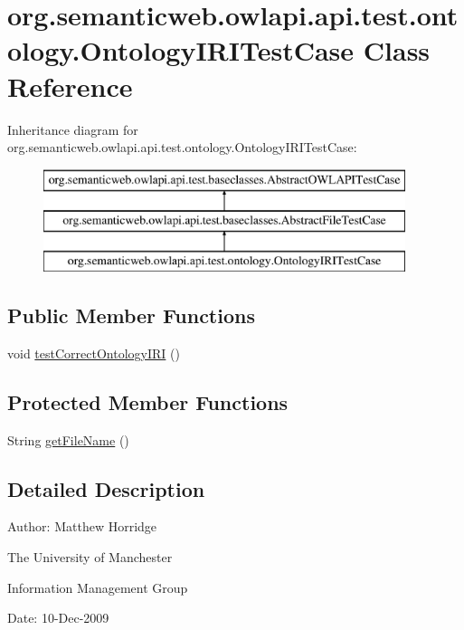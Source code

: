 \hypertarget{classorg_1_1semanticweb_1_1owlapi_1_1api_1_1test_1_1ontology_1_1_ontology_i_r_i_test_case}{\section{org.\-semanticweb.\-owlapi.\-api.\-test.\-ontology.\-Ontology\-I\-R\-I\-Test\-Case Class Reference}
\label{classorg_1_1semanticweb_1_1owlapi_1_1api_1_1test_1_1ontology_1_1_ontology_i_r_i_test_case}
}
Inheritance diagram for org.\-semanticweb.\-owlapi.\-api.\-test.\-ontology.\-Ontology\-I\-R\-I\-Test\-Case\-:\begin{figure}[H]
\begin{center}
\leavevmode
\includegraphics[height=3.000000cm]{classorg_1_1semanticweb_1_1owlapi_1_1api_1_1test_1_1ontology_1_1_ontology_i_r_i_test_case}
\end{center}
\end{figure}
\subsection*{Public Member Functions}
\begin{DoxyCompactItemize}
\item 
void \hyperlink{classorg_1_1semanticweb_1_1owlapi_1_1api_1_1test_1_1ontology_1_1_ontology_i_r_i_test_case_af3303bf5a8544690d4d22e6ce17cedb6}{test\-Correct\-Ontology\-I\-R\-I} ()
\end{DoxyCompactItemize}
\subsection*{Protected Member Functions}
\begin{DoxyCompactItemize}
\item 
String \hyperlink{classorg_1_1semanticweb_1_1owlapi_1_1api_1_1test_1_1ontology_1_1_ontology_i_r_i_test_case_ae2dca15563aa0fad20a0218ad493c836}{get\-File\-Name} ()
\end{DoxyCompactItemize}


\subsection{Detailed Description}
Author\-: Matthew Horridge\par
 The University of Manchester\par
 Information Management Group\par
 Date\-: 10-\/\-Dec-\/2009 

